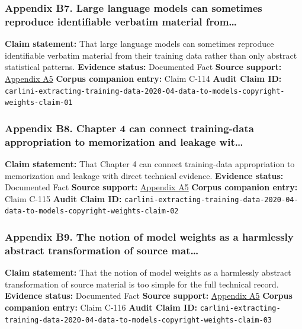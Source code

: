 \documentclass[
  american,
  11pt,
  letterpaper,
]{article}
\begin{document}
\subsubsection{Appendix B7. Large language models can sometimes
reproduce identifiable verbatim material
from\ldots{}}\label{ch-04-appendix-b7-large-language-models-can-sometimes-reproduce-identifiable-verbatim-material-from}

\textbf{Claim statement:} That large language models can sometimes
reproduce identifiable verbatim material from their training data rather
than only abstract statistical patterns. \textbf{Evidence status:}
Documented Fact \textbf{Source support:}
\hyperref[ch-04-appendix-a5-extracting-training-data-from-large-language-models]{Appendix
A5} \textbf{Corpus companion entry:} Claim C-114 \textbf{Audit Claim
ID:}
\texttt{carlini-extracting-training-data-2020-04-data-to-models-copyright-weights-claim-01}

\subsubsection{Appendix B8. Chapter 4 can connect training-data
appropriation to memorization and leakage
wit\ldots{}}\label{ch-04-appendix-b8-chapter-4-can-connect-training-data-appropriation-to-memorization-and-leakage-wit}

\textbf{Claim statement:} That Chapter 4 can connect training-data
appropriation to memorization and leakage with direct technical
evidence. \textbf{Evidence status:} Documented Fact \textbf{Source
support:}
\hyperref[ch-04-appendix-a5-extracting-training-data-from-large-language-models]{Appendix
A5} \textbf{Corpus companion entry:} Claim C-115 \textbf{Audit Claim
ID:}
\texttt{carlini-extracting-training-data-2020-04-data-to-models-copyright-weights-claim-02}

\subsubsection{Appendix B9. The notion of model weights as a harmlessly
abstract transformation of source
mat\ldots{}}\label{ch-04-appendix-b9-the-notion-of-model-weights-as-a-harmlessly-abstract-transformation-of-source-mat}

\textbf{Claim statement:} That the notion of model weights as a
harmlessly abstract transformation of source material is too simple for
the full technical record. \textbf{Evidence status:} Documented Fact
\textbf{Source support:}
\hyperref[ch-04-appendix-a5-extracting-training-data-from-large-language-models]{Appendix
A5} \textbf{Corpus companion entry:} Claim C-116 \textbf{Audit Claim
ID:}
\texttt{carlini-extracting-training-data-2020-04-data-to-models-copyright-weights-claim-03}
\end{document}
